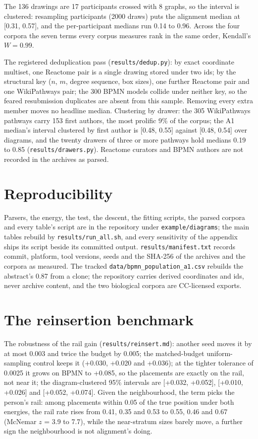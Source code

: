 \documentclass[a4paper,UKenglish]{gd-lipics-v3}
\begin{document}
The 136 drawings are
17 participants crossed with 8 graphs, so the interval is clustered: resampling
participants (2000 draws) puts the alignment median at [0.31, 0.57], and the
per-participant medians run 0.14 to 0.96. Across the four corpora the seven terms every
corpus measures rank in the same order, Kendall's $W = 0.99$.

The registered deduplication pass
(\texttt{results/dedup.py}): by exact coordinate multiset, one Reactome pair is a single
drawing stored under two ids; by the structural key ($n$, $m$, degree sequence, box
sizes), one further Reactome pair and one WikiPathways pair; the 300 BPMN models collide
under neither key, so the feared resubmission duplicates are absent from this sample.
Removing every extra member moves no headline median. Clustering by drawer: the 305
WikiPathways pathways carry 153 first authors, the most prolific 9\% of the corpus; the
A1 median's interval clustered by first author is [0.48, 0.55] against [0.48, 0.54] over
diagrams, and the twenty drawers of three or more pathways hold medians 0.19 to 0.85
(\texttt{results/drawers.py}). Reactome curators and BPMN authors are not recorded in
the archives as parsed.

\section{Reproducibility}\label{app:repro}

Parsers, the energy, the test, the descent, the fitting scripts, the parsed corpora and
every table's script are in the repository under \texttt{example/diagrams}; the main
tables rebuild by \texttt{results/run\_all.sh}, and every sensitivity of the appendix
ships its script beside its committed output. \texttt{results/manifest.txt} records
commit, platform, tool versions, seeds and the SHA-256 of the archives and the corpora
as measured. The tracked \texttt{data/bpmn\_population\_a1.csv} rebuilds the abstract's
0.87 from a clone; the repository carries derived coordinates and ids, never archive
content, and the two biological corpora are CC-licensed exports.

\section{The reinsertion benchmark}\label{app:reinsert}

The robustness of the rail gain (\texttt{results/reinsert.md}): another seed moves it
by at most 0.003 and twice the budget by 0.005; the matched-budget uniform-sampling
control keeps it (+0.030, +0.020 and +0.036); at the tighter tolerance of 0.0025 it
grows on BPMN to +0.085, so the placements are exactly on the rail, not near it; the
diagram-clustered 95\% intervals are [+0.032, +0.052], [+0.010, +0.026] and [+0.052,
+0.074]. Given the neighbourhood, the term picks the person's rail: among placements
within 0.05 of the true position under both energies, the rail rate rises from 0.41,
0.35 and 0.53 to 0.55, 0.46 and 0.67 (McNemar $z$ = 3.9 to 7.7), while the
near-stratum sizes barely move, a further sign the neighbourhood is not alignment's
doing.
\end{document}
